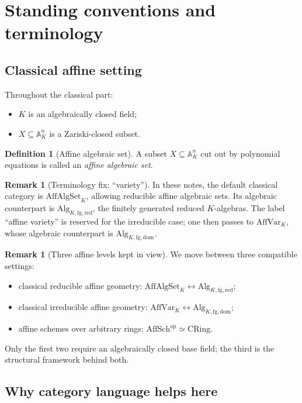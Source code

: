 \documentclass[12pt, a4paper]{article}
\theoremstyle{definition}
\newtheorem{definition}[theorem]{Definition}
\newtheorem{remark}[theorem]{Remark}
\newcommand{\A}{\mathbb{A}}
\newcommand{\AffAlgSetK}{\mathrm{AffAlgSet}_K}
\newcommand{\AffVarK}{\mathrm{AffVar}_K}
\newcommand{\AlgKfgred}{\mathrm{Alg}_{K,\mathrm{fg},\mathrm{red}}}
\newcommand{\AlgKfgdom}{\mathrm{Alg}_{K,\mathrm{fg},\mathrm{dom}}}
\newcommand{\AffSch}{\mathrm{AffSch}}
\newcommand{\CRing}{\mathrm{CRing}}
\begin{document}
\section{Standing conventions and terminology}

\subsection{Classical affine setting}

Throughout the classical part:
\begin{itemize}[leftmargin=2em]
    \item $K$ is an algebraically closed field;
    \item $X\subseteq \A_K^n$ is a Zariski-closed subset.
\end{itemize}

\begin{definition}[Affine algebraic set]
A subset $X\subseteq \A_K^n$ cut out by polynomial equations is called an \emph{affine algebraic set}.
\end{definition}

\begin{remark}[Terminology fix: ``variety'']
In these notes, the default classical category is $\AffAlgSetK$, allowing reducible affine algebraic sets. Its algebraic counterpart is $\AlgKfgred$, the finitely generated reduced $K$-algebras. The label ``affine variety'' is reserved for the irreducible case; one then passes to $\AffVarK$, whose algebraic counterpart is $\AlgKfgdom$.
\end{remark}

\begin{remark}[Three affine levels kept in view]
We move between three compatible settings:
\begin{itemize}[leftmargin=2em]
    \item classical reducible affine geometry: $\AffAlgSetK\leftrightarrow \AlgKfgred$;
    \item classical irreducible affine geometry: $\AffVarK\leftrightarrow \AlgKfgdom$;
    \item affine schemes over arbitrary rings: $\AffSch^{\mathrm{op}}\simeq \CRing$.
\end{itemize}
Only the first two require an algebraically closed base field; the third is the structural framework behind both.
\end{remark}

\subsection{Why category language helps here}
\end{document}
